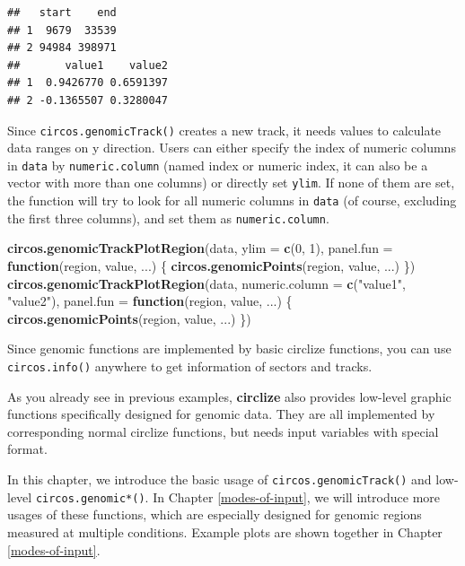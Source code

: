 \documentclass[]{book}
\newenvironment{Shaded}{\begin{snugshade}}{\end{snugshade}}
\newcommand{\KeywordTok}[1]{\textcolor[rgb]{0.13,0.29,0.53}{\textbf{#1}}}
\newcommand{\DataTypeTok}[1]{\textcolor[rgb]{0.13,0.29,0.53}{#1}}
\newcommand{\DecValTok}[1]{\textcolor[rgb]{0.00,0.00,0.81}{#1}}
\newcommand{\StringTok}[1]{\textcolor[rgb]{0.31,0.60,0.02}{#1}}
\newcommand{\ControlFlowTok}[1]{\textcolor[rgb]{0.13,0.29,0.53}{\textbf{#1}}}
\newcommand{\NormalTok}[1]{#1}
\theoremstyle{definition}
\theoremstyle{definition}
\theoremstyle{remark}
\begin{document}
\begin{verbatim}
##   start    end
## 1  9679  33539
## 2 94984 398971
##       value1    value2
## 1  0.9426770 0.6591397
## 2 -0.1365507 0.3280047
\end{verbatim}

Since \texttt{circos.genomicTrack()} creates a new track, it needs
values to calculate data ranges on y direction. Users can either specify
the index of numeric columns in \texttt{data} by \texttt{numeric.column}
(named index or numeric index, it can also be a vector with more than
one columns) or directly set \texttt{ylim}. If none of them are set, the
function will try to look for all numeric columns in \texttt{data} (of
course, excluding the first three columns), and set them as
\texttt{numeric.column}.

\begin{Shaded}
\begin{Highlighting}[]
\KeywordTok{circos.genomicTrackPlotRegion}\NormalTok{(data, }\DataTypeTok{ylim =} \KeywordTok{c}\NormalTok{(}\DecValTok{0}\NormalTok{, }\DecValTok{1}\NormalTok{),}
    \DataTypeTok{panel.fun =} \ControlFlowTok{function}\NormalTok{(region, value, ...) \{}
        \KeywordTok{circos.genomicPoints}\NormalTok{(region, value, ...)}
\NormalTok{\})}
\KeywordTok{circos.genomicTrackPlotRegion}\NormalTok{(data, }\DataTypeTok{numeric.column =} \KeywordTok{c}\NormalTok{(}\StringTok{"value1"}\NormalTok{, }\StringTok{"value2"}\NormalTok{), }
    \DataTypeTok{panel.fun =} \ControlFlowTok{function}\NormalTok{(region, value, ...) \{}
        \KeywordTok{circos.genomicPoints}\NormalTok{(region, value, ...)}
\NormalTok{\})}
\end{Highlighting}
\end{Shaded}

Since genomic functions are implemented by basic circlize functions, you
can use \texttt{circos.info()} anywhere to get information of sectors
and tracks.

As you already see in previous examples, \textbf{circlize} also provides
low-level graphic functions specifically designed for genomic data. They
are all implemented by corresponding normal circlize functions, but
needs input variables with special format.

In this chapter, we introduce the basic usage of
\texttt{circos.genomicTrack()} and low-level \texttt{circos.genomic*()}.
In Chapter \ref{modes-of-input}, we will introduce more usages of these
functions, which are especially designed for genomic regions measured at
multiple conditions. Example plots are shown together in Chapter
\ref{modes-of-input}.
\end{document}
